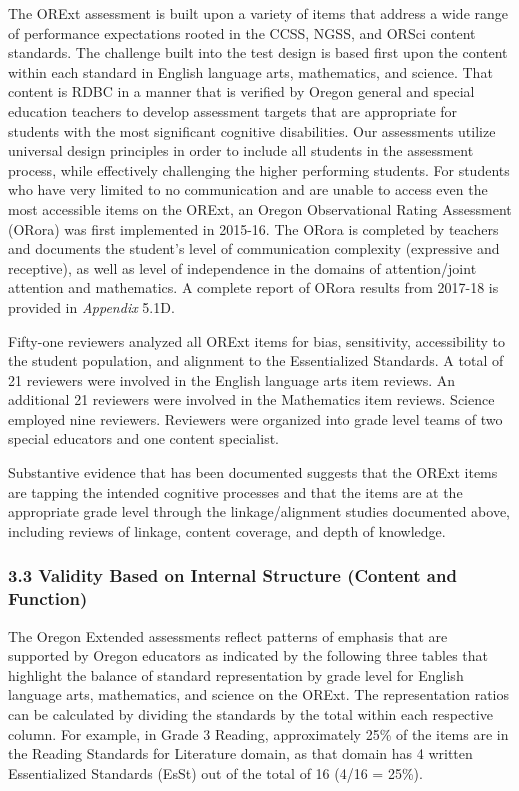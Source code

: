\documentclass[]{article}
\begin{document}
The ORExt assessment is built upon a variety of items that address a
wide range of performance expectations rooted in the CCSS, NGSS, and
ORSci content standards. The challenge built into the test design is
based first upon the content within each standard in English language
arts, mathematics, and science. That content is RDBC in a manner that is
verified by Oregon general and special education teachers to develop
assessment targets that are appropriate for students with the most
significant cognitive disabilities. Our assessments utilize universal
design principles in order to include all students in the assessment
process, while effectively challenging the higher performing students.
For students who have very limited to no communication and are unable to
access even the most accessible items on the ORExt, an Oregon
Observational Rating Assessment (ORora) was first implemented in
2015-16. The ORora is completed by teachers and documents the student's
level of communication complexity (expressive and receptive), as well as
level of independence in the domains of attention/joint attention and
mathematics. A complete report of ORora results from 2017-18 is provided
in \emph{Appendix} 5.1D.

Fifty-one reviewers analyzed all ORExt items for bias, sensitivity,
accessibility to the student population, and alignment to the
Essentialized Standards. A total of 21 reviewers were involved in the
English language arts item reviews. An additional 21 reviewers were
involved in the Mathematics item reviews. Science employed nine
reviewers. Reviewers were organized into grade level teams of two
special educators and one content specialist.

Substantive evidence that has been documented suggests that the ORExt
items are tapping the intended cognitive processes and that the items
are at the appropriate grade level through the linkage/alignment studies
documented above, including reviews of linkage, content coverage, and
depth of knowledge.

\hypertarget{validity-based-on-internal-structure-content-and-function}{%
\subsubsection{3.3 Validity Based on Internal Structure (Content and
Function)}\label{validity-based-on-internal-structure-content-and-function}}

The Oregon Extended assessments reflect patterns of emphasis that are
supported by Oregon educators as indicated by the following three tables
that highlight the balance of standard representation by grade level for
English language arts, mathematics, and science on the ORExt. The
representation ratios can be calculated by dividing the standards by the
total within each respective column. For example, in Grade 3 Reading,
approximately 25\% of the items are in the Reading Standards for
Literature domain, as that domain has 4 written Essentialized Standards
(EsSt) out of the total of 16 (4/16 = 25\%).
\end{document}
